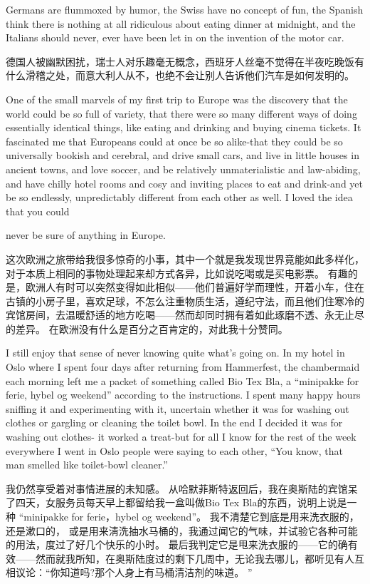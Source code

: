 \documentclass[cs4size, a4paper, 12pt]{article}
\newcounter{numpar}
\newcommand*{\newpar}{\numpar{}}
\begin{document}
	\newpar Germans are flummoxed by humor, the Swiss have no concept of fun, the Spanish think there is nothing at all ridiculous about eating dinner at midnight, and the Italians should never, ever have been let in on the invention of the motor car.
	
	德国人被幽默困扰，瑞士人对乐趣毫无概念，西班牙人丝毫不觉得在半夜吃晚饭有什么滑稽之处，而意大利人从不，也绝不会让别人告诉他们汽车是如何发明的。 
	
	\newpar One of the small marvels of my first trip to Europe was the discovery that the world could be so full of variety, that there were so many different ways of doing essentially identical things, like eating and drinking and buying cinema tickets. It fascinated me that Europeans could at once be so alike-that they could be so universally bookish and cerebral, and drive small cars, and live in little houses in ancient towns, and love soccer, and be relatively unmaterialistic and law-abiding, and have chilly hotel rooms and cosy and inviting places to eat and drink-and yet be so endlessly, unpredictably different from each other as well. I loved the idea that you could
	
	\newpar never be sure of anything in Europe.
	
	这次欧洲之旅带给我很多惊奇的小事，其中一个就是我发现世界竟能如此多样化，对于本质上相同的事物处理起来却方式各异，比如说吃喝或是买电影票。 有趣的是，欧洲人有时可以突然变得如此相似——他们普遍好学而理性，开着小车，住在古镇的小房子里，喜欢足球，不怎么注重物质生活，遵纪守法，而且他们住寒冷的宾馆房间，去温暖舒适的地方吃喝——然而却同时拥有着如此琢磨不透、永无止尽的差异。 在欧洲没有什么是百分之百肯定的，对此我十分赞同。 
	
	\newpar I still enjoy that sense of never knowing quite what's going on. In my hotel in Oslo where I spent four days after returning from Hammerfest, the chambermaid each morning left me a packet of something called Bio Tex Bla, a ``minipakke for ferie, hybel og weekend'' according to the instructions. I spent many happy hours sniffing it and experimenting with it, uncertain whether it was for washing out clothes or gargling or cleaning the toilet bowl. In the end I decided it was for washing out clothes- it worked a treat-but for all I know for the rest of the week everywhere I went in Oslo people were saying to each other, ``You know, that man smelled like toilet-bowl cleaner.''
	
	我仍然享受着对事情进展的未知感。 从哈默菲斯特返回后，我在奥斯陆的宾馆呆了四天，女服务员每天早上都留给我一盒叫做Bio Tex Bla的东西，说明上说是一种 ``minipakke for ferie，hybel og weekend''。 我不清楚它到底是用来洗衣服的，还是漱口的， 或是用来淸洗抽水马桶的，我通过闻它的气味，并试验它各种可能的用法，度过了好几个快乐的小时。 最后我判定它是甩来洗衣服的——它的确有效——然而就我所知，在奥斯陆度过的剩下几周中，无论我去哪儿，都听见有人互相议论：``你知道吗?那个人身上有马桶清洁剂的味道。 ''
	
\end{document}
